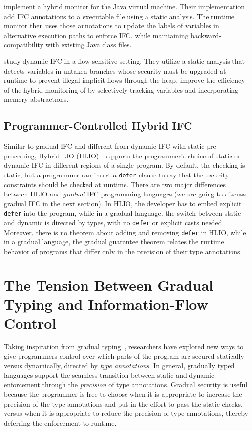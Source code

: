 \textcite{Chandra:2007we} implement a hybrid monitor for the Java virtual
machine. Their implementation add IFC annotations to a executable file using a
static analysis. The runtime monitor then uses those annotations to update the
labels of variables in alternative execution paths to enforce IFC, while
maintaining backward-compatibility with existing Java class files.

\textcite{russo2010dynamic} study dynamic IFC in a flow-sensitive setting. They
utilize a static analysis that detects variables in untaken branches whose
security must be upgraded at runtime to prevent illegal implicit flows
through the heap. \textcite{moore2011static} improve the efficiency of the
hybrid monitoring of \textcite{russo2010dynamic} by selectively tracking
variables and incorporating memory abstractions.

\subsection{Programmer-Controlled Hybrid IFC}
\label{sec:intro-hybrid}

Similar to gradual IFC and different from dynamic IFC with static
pre-processing, Hybrid LIO (HLIO)~\cite{Buiras:2015aa} supports the programmer's
choice of static or dynamic IFC in different regions of a single program. By
default, the checking is static, but a programmer can insert a \texttt{defer}
clause to say that the security constraints should be checked at runtime. There
are two major differences between HLIO and \textit{gradual} IFC programming
languages (we are going to discuss gradual IFC in the next section). In HLIO,
the developer has to embed explicit \texttt{defer} into the program, while in a
gradual language, the switch between static and dynamic is directed by types,
with no \texttt{defer} or explicit casts needed. Moreover, there is no theorem
about adding and removing \texttt{defer} in HLIO, while in a gradual language,
the gradual guarantee theorem relates the runtime behavior of programs that
differ only in the precision of their type annotations.

\section{The Tension Between Gradual Typing and Information-Flow Control}
\label{sec:intro-gradual-ifc}

Taking inspiration from gradual typing~\parencite{Siek:2006bh,Siek:2007qy},
researchers have explored new ways to give programmers control over which parts
of the program are secured statically versus dynamically, directed by
\textit{type annotations}. In general, gradually typed languages support the
seamless transition between static and dynamic enforcement through the
\textit{precision} of type annotations. Gradual security is useful because the
programmer is free to choose when it is appropriate to increase the precision of
the type annotations and put in the effort to pass the static checks, versus
when it is appropriate to reduce the precision of type annotations, thereby
deferring the enforcement to runtime.

